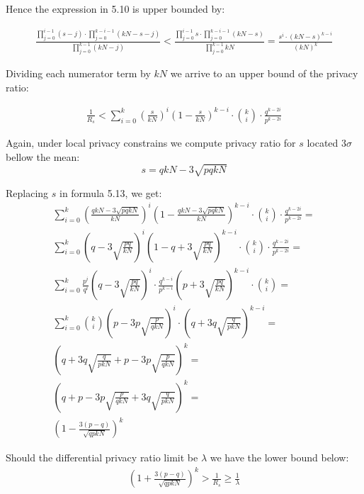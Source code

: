 \documentclass[11pt,draft]{article}
\begin{document}
Hence the expression in 5.10 is upper bounded by:

\begin{align}
\frac{ \prod_{j=0}^{i-1} (s-j) \cdot \prod_{j=0}^{k-i-1} (kN - s-j) }{  \prod_{j=0}^{k-1} (kN -j) }  < \frac{ \prod_{j=0}^{i-1} s \cdot \prod_{j=0}^{k-i-1} (kN - s)}{  \prod_{j=0}^{k-1} kN } = \frac{s^i \cdot (kN - s)^{k-i} } { (kN)^k }
\end{align}

Dividing each numerator term by $kN$ we arrive to an upper bound of the privacy ratio:

\begin{align}
\frac{1}{R_s} < \sum_{i=0}^{k}  \left ( \frac{s}{kN} \right )^i \left ( 1 - \frac{s}{kN} \right )^{k-i} \cdot \binom{k}{i}  \cdot \frac{q^{k-2i}} {p^{k-2i}}
\end{align}

Again, under local privacy constrains we compute privacy ratio for $s$ located $3 \sigma$ bellow the mean:
\[ s = qkN - 3 \sqrt{pqkN} \]

Replacing $s$ in formula 5.13, we get:
\begin{align}
\sum_{i=0}^{k}  \left ( \frac{qkN - 3 \sqrt{pqkN} }{kN} \right )^i \left ( 1 - \frac{qkN - 3 \sqrt{pqkN} }{kN} \right )^{k-i} \cdot \binom{k}{i}  \cdot \frac{q^{k-2i}} {p^{k-2i}} = \\
\sum_{i=0}^{k}  \left ( q - 3 \sqrt{\frac{pq}{kN}} \right )^i \left ( 1 - q + 3 \sqrt{\frac{pq}{kN}} \right )^{k-i} \cdot \binom{k}{i}  \cdot \frac{q^{k-2i}} {p^{k-2i}} = \\
\sum_{i=0}^{k}  \frac{p^i}{q^i} \left ( q - 3 \sqrt{\frac{pq}{kN}} \right )^i  \cdot \frac{q^{k-i}}{p^{k-i}} \left ( p + 3 \sqrt{\frac{pq}{kN}} \right )^{k-i} \cdot \binom{k}{i} = \\
\sum_{i=0}^{k}   \binom{k}{i} \left ( p - 3p \sqrt{\frac{p}{qkN}} \right )^i  \cdot  \left ( q + 3q \sqrt{\frac{q}{pkN}} \right )^{k-i} = \\
\left ( q + 3q \sqrt{\frac{q}{pkN}} + p - 3p \sqrt{\frac{p}{qkN}}  \right )^k = \\
\left ( q + p - 3p \sqrt{\frac{p}{qkN}}  + 3q \sqrt{\frac{q}{pkN}} \right )^k = \\
\left ( 1 - \frac{3(p-q)}{\sqrt{qpkN}} \right )^k
\end{align}

Should the differential privacy ratio limit be $\lambda$ we have the lower bound below:
\begin{align}
 \left ( 1 + \frac{3(p-q)}{\sqrt{qpkN}} \right )^k  > \frac{1}{R_s} \ge \frac{1}{\lambda}
 \end{align}
\end{document}
